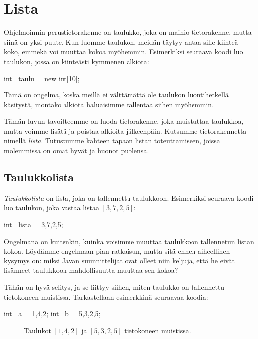 \chapter{Lista}

Ohjelmoinnin perustietorakenne on taulukko,
joka on mainio tietorakenne, mutta siinä on yksi puute.
Kun luomme taulukon, meidän täytyy antaa sille
kiinteä koko, emmekä voi muuttaa kokoa myöhemmin.
Esimerkiksi seuraava koodi luo taulukon,
jossa on kiinteästi kymmenen alkiota:

\begin{code}
int[] taulu = new int[10];
\end{code}

Tämä on ongelma, koska meillä ei välttämättä ole
taulukon luontihetkellä käsitystä, montako alkiota
haluaisimme tallentaa siihen myöhemmin.

Tämän luvun tavoitteemme on luoda tietorakenne,
joka muistuttaa taulukkoa, mutta 
voimme lisätä ja poistaa alkioita jälkeenpäin.
Kutsumme tietorakennetta nimellä \emph{lista}.
Tutustumme kahteen tapaan listan toteuttamiseen,
joissa molemmissa on omat hyvät ja huonot puolensa.

\section{Taulukkolista}

\emph{Taulukkolista} on lista, joka on tallennettu taulukkoon.
Esimerkiksi seuraava koodi luo taulukon,
joka vastaa listaa $[3,7,2,5]$:

\begin{code}
int[] lista = {3,7,2,5};
\end{code}

Ongelmana on kuitenkin, kuinka voisimme muuttaa
taulukkoon tallennetun listan kokoa.
Löydämme ongelmaan pian ratkaisun, mutta sitä ennen
aiheellinen kysymys on:
miksi Javan suunnittelijat ovat olleet niin keljuja,
että he eivät lisänneet taulukkoon mahdollisuutta
muuttaa sen kokoa?

Tähän on hyvä selitys, ja se liittyy siihen,
miten taulukko on tallennettu tietokoneen muistissa.
Tarkastellaan esimerkkinä seuraavaa koodia:

\begin{code}
int[] a = {1,4,2};
int[] b = {5,3,2,5};
\end{code}

\begin{figure}
\center
{}
\caption{Taulukot $[1,4,2]$ ja $[5,3,2,5]$ tietokoneen muistissa.}
\label{fig:taumui}
\end{figure}

